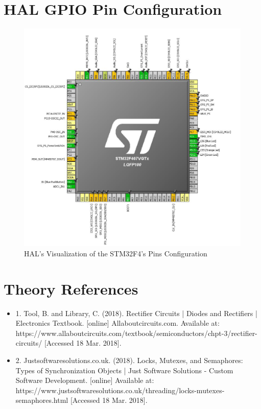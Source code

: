 \documentclass[12pt]{report}
\begin{document}
\begin{appendix}
	\chapter{HAL GPIO Pin Configuration}\label{pinconfig}
	\begin{figure}[h]
	\label{HAL GPIO Pin Configuration}
		\begin{center}
			\includegraphics[scale=0.7]{./figures/pin_config.PNG}
			\caption{HAL's Visualization of the STM32F4's Pins Configuration}
		\end{center}
	\end{figure}
	\newpage
	
	
	\chapter{Theory References}
	\begin{itemize}
		\item 1. Tool, B. and Library, C. (2018). Rectifier Circuits | Diodes and Rectifiers | Electronics Textbook. [online] Allaboutcircuits.com. Available at: https://www.allaboutcircuits.com/textbook/semiconductors/chpt-3/rectifier-circuits/ [Accessed 18 Mar. 2018].
		\item 2. Justsoftwaresolutions.co.uk. (2018). Locks, Mutexes, and Semaphores: Types of Synchronization Objects | Just Software Solutions - Custom Software Development. [online] Available at: https://www.justsoftwaresolutions.co.uk/threading/locks-mutexes-semaphores.html [Accessed 18 Mar. 2018].
	\end{itemize}
\end{appendix}
\end{document}
